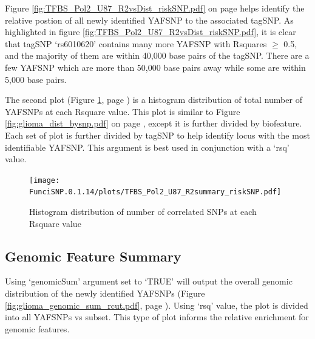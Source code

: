 \documentclass[12pt,fullpage]{article}
\begin{document}
Figure \ref{fig:TFBS_Pol2_U87_R2vsDist_riskSNP.pdf} on page
\pageref{fig:TFBS_Pol2_U87_R2vsDist_riskSNP.pdf} helps identify the relative
postion of all newly identified YAFSNP to the associated tagSNP. As
highlighted in figure \ref{fig:TFBS_Pol2_U87_R2vsDist_riskSNP.pdf}, it is clear
that tagSNP `rs6010620' contains many more YAFSNP with Rsquares $\ge$ 0.5,
     and the majority of them are within 40,000 base pairs of the tagSNP. There
     are a few YAFSNP which are more than 50,000 base pairs away while some
     are within 5,000 base pairs.

The second plot (Figure \ref{fig:TFBS_Pol2_U87_R2summary_riskSNP.pdf}, page
        \pageref{fig:TFBS_Pol2_U87_R2summary_riskSNP.pdf}) is a histogram
distribution of total number of YAFSNPs at each Rsquare value. This plot is
similar to Figure \ref{fig:glioma_dist_bysnp.pdf} on page
\pageref{fig:glioma_dist_bysnp.pdf}, except it is further divided by biofeature.
Each set of plot is further divided by tagSNP to help identify locus with the
most identifiable YAFSNP. This argument is best used in conjunction with a
`rsq' value.

\begin{figure}[ht!]
\begin{center}
\texttt{[image: FunciSNP.0.1.14/plots/TFBS\_Pol2\_U87\_R2summary\_riskSNP.pdf]}
\caption{\label{fig:TFBS_Pol2_U87_R2summary_riskSNP.pdf} Histogram 
distribution of number of correlated SNPs at each Rsquare value}
{\footnotesize{}}
\end{center}
\end{figure}

\subsection{Genomic Feature Summary}                                             
                                                                                 
Using `genomicSum' argument set to `TRUE' will output the overall genomic        
distribution of the newly identified YAFSNPs (Figure                         
        \ref{fig:glioma_genomic_sum_rcut.pdf}, page                                      
        \pageref{fig:glioma_genomic_sum_rcut.pdf}).  Using `rsq' value, the plot
is         
divided into all YAFSNPs vs subset. This type of plot informs the relative   
enrichment for genomic features.                                                 
                                                                                 
\end{document}
